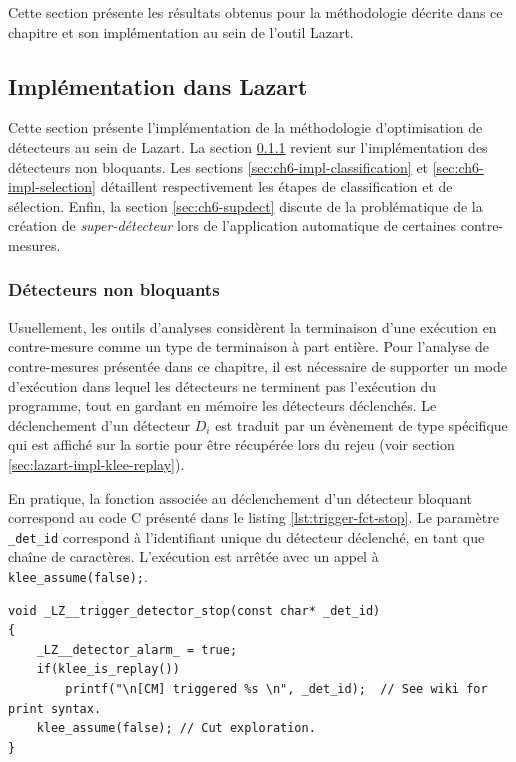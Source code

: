         Cette section présente les résultats obtenus pour la méthodologie décrite dans ce chapitre et son implémentation au sein de l'outil Lazart.
        
        \subsection{Implémentation dans Lazart}
        \label{sec:ch6-impl}

            Cette section présente l'implémentation de la méthodologie d'optimisation de détecteurs au sein de Lazart.
            La section \ref{sec:ch6-non block} revient sur l'implémentation des détecteurs non bloquants. 
            Les sections \ref{sec:ch6-impl-classification} et \ref{sec:ch6-impl-selection} détaillent respectivement les étapes de classification et de sélection.
            Enfin, la section \ref{sec:ch6-supdect} discute de la problématique de la création de \textit{super-détecteur} lors de l'application automatique de certaines contre-mesures.

            \subsubsection{Détecteurs non bloquants}
            \label{sec:ch6-non block}
        
                Usuellement, les outils d'analyses considèrent la terminaison d'une exécution en contre-mesure comme un type de terminaison à part entière.                 
                Pour l'analyse de contre-mesures présentée dans ce chapitre, il est nécessaire de supporter un mode d'exécution dans lequel les détecteurs ne terminent pas l'exécution du programme, tout en gardant en mémoire les détecteurs déclenchés. 
                Le déclenchement d'un détecteur $D_i$ est traduit par un évènement de type spécifique qui est affiché sur la sortie pour être récupérée lors du rejeu (voir section \ref{sec:lazart-impl-klee-replay}).   
            
                En pratique, la fonction associée au déclenchement d'un détecteur bloquant correspond au code C présenté dans le listing \ref{lst:trigger-fct-stop}. Le paramètre \texttt{\_det\_id} correspond à l'identifiant unique du détecteur déclenché, en tant que chaîne de caractères. 
                L'exécution est arrêtée avec un appel à \texttt{klee\_assume(false);}.
    
\begin{lstlisting}     
void _LZ__trigger_detector_stop(const char* _det_id)
{
    _LZ__detector_alarm_ = true;
    if(klee_is_replay())
        printf("\n[CM] triggered %s \n", _det_id);  // See wiki for print syntax.
    klee_assume(false); // Cut exploration.
}
\end{lstlisting}  


